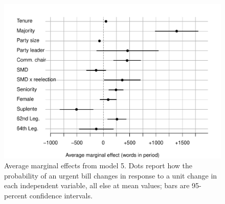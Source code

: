 \documentclass[letter,12pt]{article}
\begin{document}
\begin{figure}
  \centering
    \includegraphics[width=.8\columnwidth]{../plots/avgMgEffects.pdf}
    \caption{Average marginal effects from model 5. Dots report how the probability of an urgent bill
changes in response to a unit change in each independent variable, all else at mean values; bars are
95-percent confidence intervals.}\label{F:avgmgeff}
\end{figure}
\end{document}

